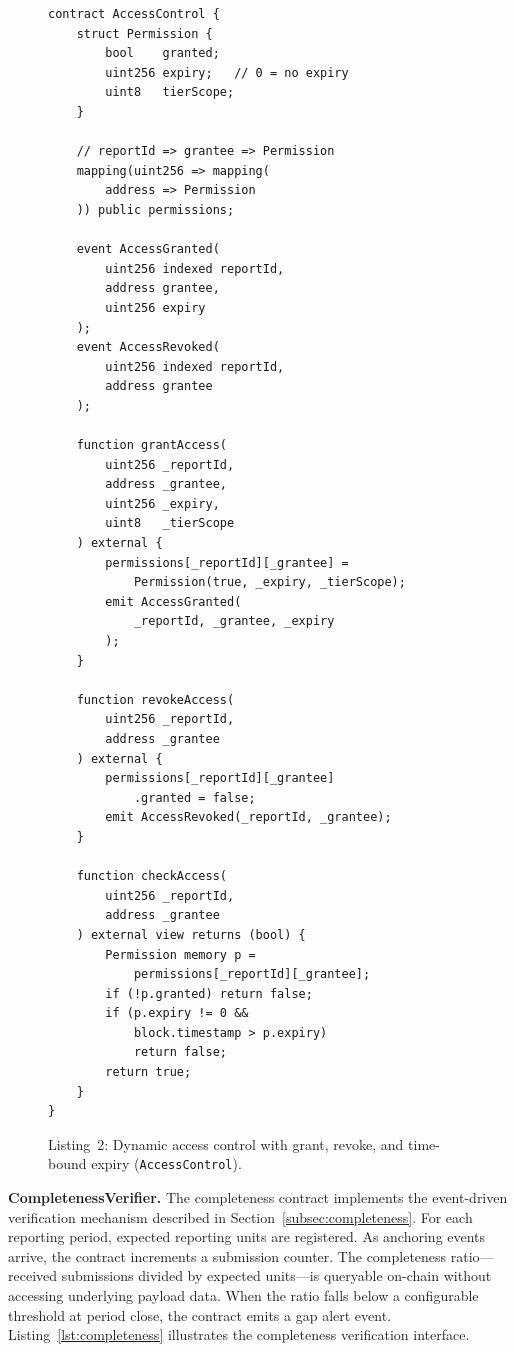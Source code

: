 \documentclass[AMA,LATO1COL]{WileyNJD-v2}
\begin{document}
\begin{figure}[!ht]
\begin{verbatim}
contract AccessControl {
    struct Permission {
        bool    granted;
        uint256 expiry;   // 0 = no expiry
        uint8   tierScope;
    }

    // reportId => grantee => Permission
    mapping(uint256 => mapping(
        address => Permission
    )) public permissions;

    event AccessGranted(
        uint256 indexed reportId,
        address grantee,
        uint256 expiry
    );
    event AccessRevoked(
        uint256 indexed reportId,
        address grantee
    );

    function grantAccess(
        uint256 _reportId,
        address _grantee,
        uint256 _expiry,
        uint8   _tierScope
    ) external {
        permissions[_reportId][_grantee] =
            Permission(true, _expiry, _tierScope);
        emit AccessGranted(
            _reportId, _grantee, _expiry
        );
    }

    function revokeAccess(
        uint256 _reportId,
        address _grantee
    ) external {
        permissions[_reportId][_grantee]
            .granted = false;
        emit AccessRevoked(_reportId, _grantee);
    }

    function checkAccess(
        uint256 _reportId,
        address _grantee
    ) external view returns (bool) {
        Permission memory p =
            permissions[_reportId][_grantee];
        if (!p.granted) return false;
        if (p.expiry != 0 &&
            block.timestamp > p.expiry)
            return false;
        return true;
    }
}
\end{verbatim}
\caption*{Listing~2: Dynamic access control with grant, revoke, and time-bound expiry (\texttt{AccessControl}).}\label{lst:acl}
\end{figure}

\textbf{CompletenessVerifier.} The completeness contract implements the event-driven verification mechanism described in Section~\ref{subsec:completeness}. For each reporting period, expected reporting units are registered. As anchoring events arrive, the contract increments a submission counter. The completeness ratio---received submissions divided by expected units---is queryable on-chain without accessing underlying payload data. When the ratio falls below a configurable threshold at period close, the contract emits a gap alert event. Listing~\ref{lst:completeness} illustrates the completeness verification interface.
\end{document}
